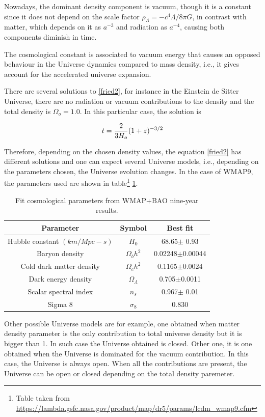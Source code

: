 Nowadays, the dominant density component is vacuum, though it is a constant
since it does not depend on the scale factor $\rho_{\Lambda}=-c^4\Lambda/8\pi G$,
in contrast with matter, which depends on it as $a^{-3}$ and radiation as $a^{-4}$,
causing both components diminish in time. 

The cosmological constant is associated to vacuum energy that causes an
opposed behaviour in the Universe dynamics compared to mass density, i.e., 
it gives account for the accelerated universe expansion. 

There are several solutions to \ref{fried2}, for instance in the Einstein de 
Sitter Universe, there are no radiation or vacuum contributions to the density
and the total density is $\Omega_o=1.0$. In this particular case, the solution
is

\[
t = \frac{2}{3H_o}(1+z)^{-3/2}
\]

Therefore, depending on the chosen density values, the equation \ref{fried2}
has different solutions and one can expect several Universe models, i.e.,
depending on the parameters chosen, the Universe evolution changes.  
In the case of WMAP9, the parameters used are shown in table\footnote{Table taken from \url{https://lambda.gsfc.nasa.gov/product/map/dr5/params/lcdm_wmap9.cfm}} \ref{WMAPtable}. 

\begin{table}
\begin{center}
  \begin{tabular}{ | c | c | c |}
    \hline \hline
    Parameter & Symbol & Best fit \\ \hline \hline 
    Hubble constant $(km/Mpc-s)$ & $H_0$ & 68.65$\pm$ 0.93 \\ \hline
    Baryon density & $\Omega_b h^2$ & 0.02248$\pm$0.00044 \\ \hline
    Cold dark matter density & $\Omega_c h^2$ & 0.1165$\pm$0.0024 \\  \hline
    Dark energy density & $\Omega_\Lambda$ & 0.705$\pm$0.0011\\ \hline
    Scalar spectral index & $n_s$ & 0.967$\pm$ 0.01 \\ \hline
    Sigma 8 & $\sigma_8$& 0.830 \\ \hline
  \end{tabular}
    \caption{ Fit cosmological parameters from WMAP+BAO nine-year results.}
  \label{WMAPtable}
\end{center}
\end{table}

Other possible Universe models are for example, one obtained when matter
density parameter is the only contribution to total universe density but 
it is bigger than 1. In such case the Universe obtained is closed. 
Other one, it is one obtained when the Universe is dominated for the vacuum
contribution. In this case, the Universe is always open. When all the 
contributions are present, the Universe can be open or closed depending on the
total density paremeter. 
		
